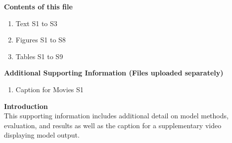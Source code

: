 \documentclass[draft,jgrga]{agutexSI2019}
\begin{document}
\begin{article}

%
%



\noindent\textbf{Contents of this file}
\begin{enumerate}
\item Text S1 to S3
\item Figures S1 to S8
\item Tables S1 to S9
\end{enumerate}
\noindent\textbf{Additional Supporting Information (Files uploaded separately)}
\begin{enumerate}
\item Caption for Movies S1
\end{enumerate}

\noindent\textbf{Introduction}\\
This supporting information includes additional detail on model methods, evaluation, and results as well as the caption for a supplementary video displaying model output.

\clearpage


\end{article}
\end{document}
